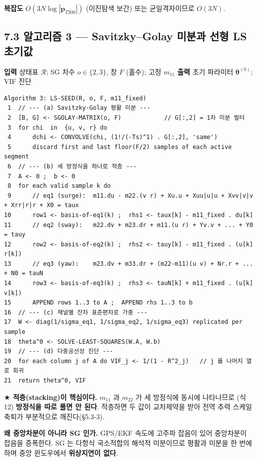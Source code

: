 \documentclass[10pt,a4paper]{article}
\begin{document}
\textbf{복잡도} $O(3N\log|\mathbf{p}_{T200}|)$ (이진탐색 보간) 또는 균일격자이므로 $O(3N)$.

\subsection*{7.3 알고리즘 3 --- Savitzky--Golay 미분과 선형 LS 초기값}

\textbf{입력} 상태표 $\mathcal{R}$; SG 차수 $o \in \{2,3\}$, 창 $F$ (홀수); 고정 $m_{11}$ \textbf{출력} 초기 파라미터 $\boldsymbol{\theta}^{(0)}$; VIF 진단

\begin{Verbatim}[fontsize=\footnotesize,frame=single,framesep=2.2mm,rulecolor=\color{black!35}]
Algorithm 3: LS-SEED(R, o, F, m11_fixed)
 1  // --- (a) Savitzky-Golay 평활 미분 ---
 2  [B, G] <- SGOLAY-MATRIX(o, F)            // G[:,2] = 1차 미분 필터
 3  for chi  in  {u, v, r} do
 4      dchi <- CONVOLVE(chi, (1!/(-Ts)^1) . G[:,2], 'same')
 5      discard first and last floor(F/2) samples of each active segment
 6  // --- (b) 세 방정식을 하나로 적층 ---
 7  A <- 0 ;  b <- 0
 8  for each valid sample k do
 9      // eq1 (surge):  m11.du - m22.(v r) + Xu.u + Xuu|u|u + Xvv|v|v + Xrr|r|r + X0 = taux
10      row1 <- basis-of-eq1(k) ;  rhs1 <- taux[k] - m11_fixed . du[k]
11      // eq2 (sway):   m22.dv + m23.dr + m11.(u r) + Yv.v + ... + Y0 = tauy
12      row2 <- basis-of-eq2(k) ;  rhs2 <- tauy[k] - m11_fixed . (u[k] r[k])
13      // eq3 (yaw):    m23.dv + m33.dr + (m22-m11)(u v) + Nr.r + ... + N0 = tauN
14      row3 <- basis-of-eq3(k) ;  rhs3 <- tauN[k] + m11_fixed . (u[k] v[k])
15      APPEND rows 1..3 to A ;  APPEND rhs 1..3 to b
16  // --- (c) 채널별 잔차 표준편차로 가중 ---
17  W <- diag(1/sigma_eq1, 1/sigma_eq2, 1/sigma_eq3) replicated per sample
18  theta^0 <- SOLVE-LEAST-SQUARES(W.A, W.b)
19  // --- (d) 다중공선성 진단 ---
20  for each column j of A do VIF_j <- 1/(1 - R^2_j)   // j 를 나머지 열로 회귀
21  return theta^0, VIF
\end{Verbatim}

\textbf{$\bigstar$ 적층(stacking)이 핵심이다.} $m_{11}$ 과 $m_{22}$ 가 세 방정식에 동시에 나타나므로 (식 12) \textbf{방정식을 따로 풀면 안 된다}. 적층하면 두 값이 교차제약을 받아 전역 추력 스케일 축퇴가 부분적으로 깨진다(\S{}5.3-3).

\textbf{왜 중앙차분이 아니라 SG 인가.} GPS/EKF 속도에 고주파 잡음이 있어 중앙차분이 잡음을 증폭한다. SG 는 다항식 국소적합의 해석적 미분이므로 평활과 미분을 한 번에 하며 중앙 윈도우에서 \textbf{위상지연이 없다}.
\end{document}
